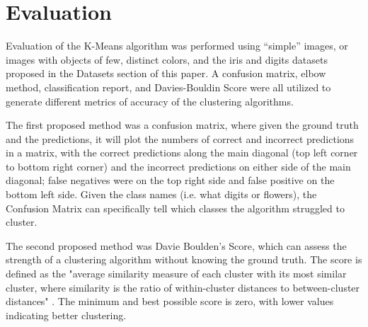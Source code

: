 \documentclass[10pt,twocolumn]{article}
\begin{document}






\section {Evaluation}

Evaluation of the K-Means algorithm was performed using 
“simple” images, or images with objects of few, distinct colors, 
and the iris and digits datasets proposed in the Datasets section of this paper. A confusion matrix, elbow method, classification report, and Davies-Bouldin Score were all utilized to generate different metrics of accuracy of the clustering algorithms.

The first proposed method was a confusion matrix, where given the ground truth and the predictions, it will plot the numbers of correct and incorrect predictions in a matrix, with the correct predictions along the main diagonal (top left corner to bottom right corner) and the incorrect predictions on either side of the main diagonal; false negatives were on the top right side and false positive on the bottom left side. Given the class names (i.e. what digits or flowers), the Confusion Matrix can specifically tell which classes the algorithm struggled to cluster.

The second proposed method was Davie Boulden's Score, which can assess the strength of a clustering algorithm without knowing the ground truth. The score is defined as the "average similarity measure of each cluster with its most similar cluster, where similarity is the ratio of within-cluster distances to between-cluster distances" \cite{skLearn2020}. The minimum and best possible score is zero, with lower values indicating better clustering.
\end{document}
